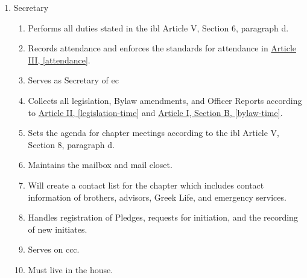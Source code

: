 \begin{enumerate}
		\item Secretary
			\begin{enumerate}
				\item Performs all duties stated in the \gls{ibl} Article V, Section 6, paragraph d.
				\item Records attendance and enforces the standards for attendance in \hyperref[attendance]{Article III, \autoref*{attendance}}.
				\item Serves as Secretary of \gls{ec}
				\item Collects all legislation, Bylaw amendments, and Officer Reports according to \hyperref[legislation-time]{Article II, \autoref*{legislation-time}} and \hyperref[bylaw-time]{Article I, Section B, \autoref*{bylaw-time}}.
				\item Sets the agenda for chapter meetings according to the \gls{ibl} Article V, Section 8, paragraph d.
				\item Maintains the mailbox and mail closet.
				\item Will create a contact list for the chapter which includes contact information of brothers, advisors, Greek Life, and emergency services.
				\item Handles registration of Pledges, requests for initiation, and the recording of new initiates.
				\item Serves on \gls{ccc}.
				\item Must live in the house.
			\end{enumerate}


\end{enumerate}
